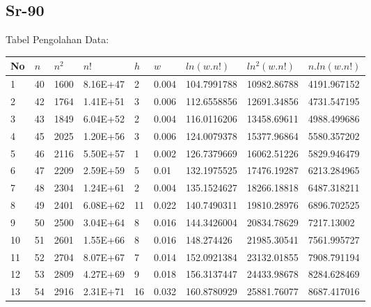 \documentclass{article}
\begin{document}
			\subsection{Sr-90}
			Tabel Pengolahan Data:
			\begin{longtable}{@{}lllllllll@{}}
				\toprule
				No  & $n$  & $n^{2}$ & $n!$   & $h$   & $w$     & $ln(w.n!)$     & $ln^{2}(w.n!)$ & $n.ln(w.n!)$   \\ \midrule
				\endfirsthead
				\endhead
				\bottomrule
				\endfoot
				\endlastfoot
				1   & 40   & 1600                 & 8.16E+47    & 2   & 0.004 & 104.7991788 & 10982.86788                 & 4191.967152 \\
				2   & 42   & 1764                 & 1.41E+51    & 3   & 0.006 & 112.6558856 & 12691.34856                 & 4731.547195 \\
				3   & 43   & 1849                 & 6.04E+52    & 2   & 0.004 & 116.0116206 & 13458.69611                 & 4988.499686 \\
				4   & 45   & 2025                 & 1.20E+56    & 3   & 0.006 & 124.0079378 & 15377.96864                 & 5580.357202 \\
				5   & 46   & 2116                 & 5.50E+57    & 1   & 0.002 & 126.7379669 & 16062.51226                 & 5829.946479 \\
				6   & 47   & 2209                 & 2.59E+59    & 5   & 0.01  & 132.1975525 & 17476.19287                 & 6213.284965 \\
				7   & 48   & 2304                 & 1.24E+61    & 2   & 0.004 & 135.1524627 & 18266.18818                 & 6487.318211 \\
				8   & 49   & 2401                 & 6.08E+62    & 11  & 0.022 & 140.7490311 & 19810.28976                 & 6896.702525 \\
				9   & 50   & 2500                 & 3.04E+64    & 8   & 0.016 & 144.3426004 & 20834.78629                 & 7217.13002  \\
				10  & 51   & 2601                 & 1.55E+66    & 8   & 0.016 & 148.274426  & 21985.30541                 & 7561.995727 \\
				11  & 52   & 2704                 & 8.07E+67    & 7   & 0.014 & 152.0921384 & 23132.01855                 & 7908.791194 \\
				12  & 53   & 2809                 & 4.27E+69    & 9   & 0.018 & 156.3137447 & 24433.98678                 & 8284.628469 \\
				13  & 54   & 2916                 & 2.31E+71    & 16  & 0.032 & 160.8780929 & 25881.76077                 & 8687.417016 \\

\end{longtable}
\end{document}
